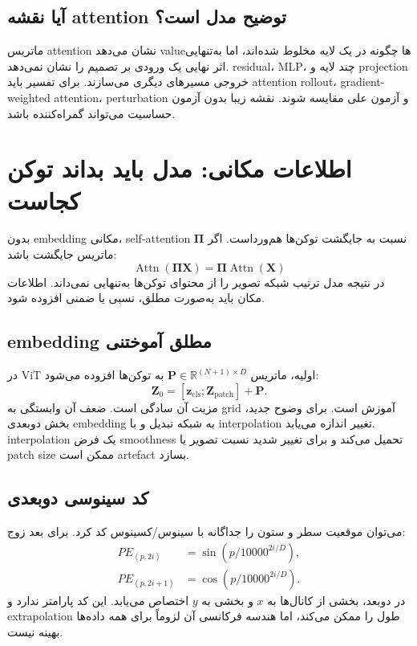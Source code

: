 \documentclass[12pt,openany,oneside]{book}
\newcommand{\R}{\mathbb{R}}
\newcommand{\vect}[1]{\bm{#1}}
\newcommand{\mat}[1]{\bm{#1}}
\begin{document}
\subsection{آیا نقشه attention توضیح مدل است؟}
ماتریس attention نشان می‌دهد valueها چگونه در یک لایه مخلوط شده‌اند، اما به‌تنهایی اثر نهایی یک ورودی بر تصمیم را نشان نمی‌دهد. residual، MLP، چند لایه و projection خروجی مسیرهای دیگری می‌سازند. برای تفسیر باید attention rollout، gradient-weighted attention، perturbation و آزمون علی مقایسه شوند. نقشه زیبا بدون آزمون حساسیت می‌تواند گمراه‌کننده باشد.

\section{اطلاعات مکانی: مدل باید بداند توکن کجاست}
بدون embedding مکانی، self-attention نسبت به جایگشت توکن‌ها هم‌ورداست. اگر $\mat \Pi$ ماتریس جایگشت باشد:
\begin{equation}
\operatorname{Attn}(\mat\Pi\mat X)
=\mat\Pi\operatorname{Attn}(\mat X)
\end{equation}
در نتیجه مدل ترتیب شبکه تصویر را از محتوای توکن‌ها به‌تنهایی نمی‌داند. اطلاعات مکان باید به‌صورت مطلق، نسبی یا ضمنی افزوده شود.

\subsection{embedding مطلق آموختنی}
در ViT اولیه، ماتریس $\mat P\in\R^{(N+1)\times D}$ به توکن‌ها افزوده می‌شود:
\begin{equation}
\mat Z_0=[\vect z_{\mathrm{cls}};\mat Z_{\mathrm{patch}}]+\mat P.
\end{equation}
مزیت آن سادگی است. ضعف آن وابستگی به grid آموزش است. برای وضوح جدید، بخش دوبعدی embedding به شبکه تبدیل و با interpolation تغییر اندازه می‌یابد. interpolation یک فرض smoothness تحمیل می‌کند و برای تغییر شدید نسبت تصویر یا patch size ممکن است artefact بسازد.

\subsection{کد سینوسی دوبعدی}
می‌توان موقعیت سطر و ستون را جداگانه با سینوس/کسینوس کد کرد. برای بعد زوج:
\begin{align}
PE_{(p,2i)}&=\sin(p/10000^{2i/D}),\\
PE_{(p,2i+1)}&=\cos(p/10000^{2i/D}).
\end{align}
در دوبعد، بخشی از کانال‌ها به $x$ و بخشی به $y$ اختصاص می‌یابد. این کد پارامتر ندارد و extrapolation طول را ممکن می‌کند، اما هندسه فرکانسی آن لزوماً برای همه داده‌ها بهینه نیست.
\end{document}

